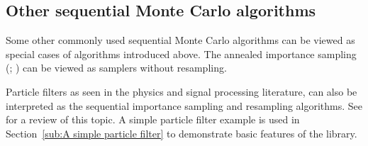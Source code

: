 \documentclass[11pt,bib,hyper]{marticle}
\begin{document}
\subsection{Other sequential Monte Carlo algorithms}
\label{sub:Other sequential Monte Carlo algorithms}

Some other commonly used sequential Monte Carlo algorithms can be viewed as
special cases of algorithms introduced above. The annealed importance sampling
(\ais; \textcite{Neal:2001we}) can be viewed as \smc samplers without resampling.

Particle filters as seen in the physics and signal processing literature, can
also be interpreted as the sequential importance sampling and resampling
algorithms. See \textcite{Doucet:2011us} for a review of this topic. A simple
particle filter example is used in Section~\ref{sub:A simple particle filter}
to demonstrate basic features of the \vsmc library.

\printbibliography[title=\refname]
\end{document}

